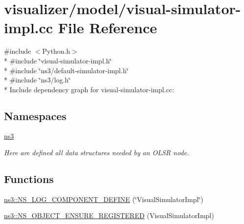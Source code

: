 \hypertarget{visual-simulator-impl_8cc}{}\section{visualizer/model/visual-\/simulator-\/impl.cc File Reference}
\label{visual-simulator-impl_8cc}
{\ttfamily \#include $<$Python.\+h$>$}\\*
{\ttfamily \#include \char`\"{}visual-\/simulator-\/impl.\+h\char`\"{}}\\*
{\ttfamily \#include \char`\"{}ns3/default-\/simulator-\/impl.\+h\char`\"{}}\\*
{\ttfamily \#include \char`\"{}ns3/log.\+h\char`\"{}}\\*
Include dependency graph for visual-\/simulator-\/impl.cc\+:
\subsection*{Namespaces}
\begin{DoxyCompactItemize}
\item 
 \hyperlink{namespacens3}{ns3}
\begin{DoxyCompactList}\small\item\em Here are defined all data structures needed by an O\+L\+SR node. \end{DoxyCompactList}\end{DoxyCompactItemize}
\subsection*{Functions}
\begin{DoxyCompactItemize}
\item 
\hyperlink{namespacens3_aa3bf984bfe4b52e0667f1d7e3deb27e5}{ns3\+::\+N\+S\+\_\+\+L\+O\+G\+\_\+\+C\+O\+M\+P\+O\+N\+E\+N\+T\+\_\+\+D\+E\+F\+I\+NE} (\char`\"{}Visual\+Simulator\+Impl\char`\"{})
\item 
\hyperlink{namespacens3_aee4ba475d7ae9ff91e9e9682f1044a87}{ns3\+::\+N\+S\+\_\+\+O\+B\+J\+E\+C\+T\+\_\+\+E\+N\+S\+U\+R\+E\+\_\+\+R\+E\+G\+I\+S\+T\+E\+R\+ED} (Visual\+Simulator\+Impl)
\end{DoxyCompactItemize}
